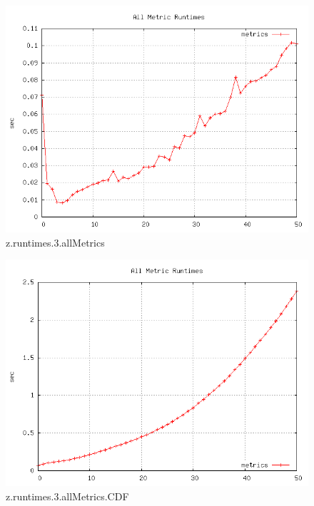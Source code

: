 \begin{figure} [h]
	\centering
	\includegraphics [scale=0.8] {plots/z.runtimes.3.allMetrics}
	\caption{z.runtimes.3.allMetrics}
	\label{plot:RANDOM_100_500 - BARABASI_ALBERT_GROWTH_10_2.z.runtimes.3.allMetrics}
\end{figure}

\begin{figure} [h]
	\centering
	\includegraphics [scale=0.8] {plots/z.runtimes.3.allMetrics.CDF}
	\caption{z.runtimes.3.allMetrics.CDF}
	\label{plot:RANDOM_100_500 - BARABASI_ALBERT_GROWTH_10_2.z.runtimes.3.allMetrics.CDF}
\end{figure}

